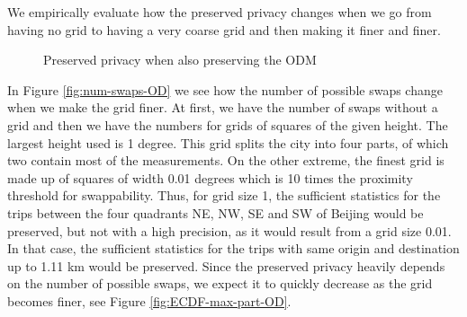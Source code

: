 \documentclass[times,twocolumn,final,authoryear]{elsarticle}
\begin{document}
We empirically evaluate how the preserved privacy changes when we go from having
no grid to having a very coarse grid and then making it finer and
finer.

\begin{figure}
\centering
  \caption{Preserved privacy when also preserving the ODM}
  \label{fig:OD}
\end{figure}

In Figure \ref{fig:num-swaps-OD} we see how the number of possible
swaps change when we make the grid finer. At first, we have the number
of swaps without a grid and then we have the numbers for grids of
squares of the given height. The largest height used is 1 degree.
This grid splits the city into four parts, of which two contain
most of the measurements. On the other extreme, the finest grid is made up of squares of width 0.01 degrees which is 10 times the proximity threshold for swappability.  
Thus, for grid size 1, the sufficient statistics for the trips between the four quadrants NE, NW, SE and SW of Beijing would be preserved, but not with a high precision, as it would result from a grid size 0.01. In that case, the sufficient statistics for the trips with same origin and destination up to 1.11 km would be preserved.
Since the preserved privacy heavily depends on the number of possible
swaps, we expect it to quickly decrease as the grid becomes finer, see Figure
\ref{fig:ECDF-max-part-OD}. 
\end{document}
